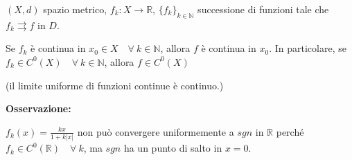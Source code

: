 	
\begin{theorem}
	\label{th: pag190}
	$(X,d)$ spazio metrico, $f_k:X \rightarrow \mathbb{R}$, $\{f_k\}_{k \in \mathbb{N}}$ successione di funzioni tale che $f_k \rightrightarrows f$ in $D$. 
	
	Se $f_k$ è continua in $x_0 \in X \quad \forall \ k \in \mathbb{N}$, allora $f$ è continua in $x_0$. In particolare, se $f_k \in C^0(X) \quad \forall \ k \in \mathbb{N}$, allora $f \in C^0(X)$
	
	(il limite uniforme di funzioni continue è continuo.)
\end{theorem}


\begin{attbar}
	\textbf{Osservazione:}
	
	$f_k(x) = \frac{kx}{1+k|x|}$ non può convergere uniformemente a $sgn$ in $\mathbb{R}$ perché $f_k \in C^0 (\mathbb{R}) \quad  \forall \ k$, ma $sgn$ ha un punto di salto in $x=0$.
\end{attbar}


